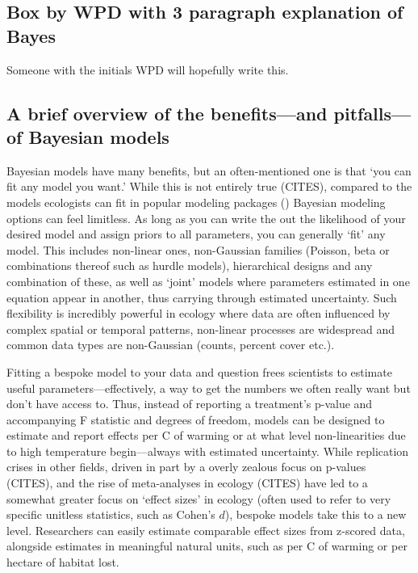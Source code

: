 \documentclass[11pt]{article}
\begin{document}
\subsection{Box by WPD with 3 paragraph explanation of Bayes}

Someone with the initials WPD will hopefully write this. 

\subsection{A brief overview of the benefits---and pitfalls---of Bayesian models} 

Bayesian models have many benefits, but an often-mentioned one is that `you can fit any model you want.' While this is not entirely true (CITES), compared to the models ecologists can fit in popular modeling packages (\eg {}) Bayesian modeling options can feel limitless. As long as you can write the out the likelihood of your desired model and assign priors to all parameters, you can generally `fit' any model. This includes non-linear ones, non-Gaussian families (\eg Poisson, beta or combinations thereof such as hurdle models), hierarchical designs and any combination of these, as well as `joint' models where parameters estimated in one equation appear in another, thus carrying through estimated uncertainty. Such flexibility is incredibly powerful in ecology where data are often influenced by complex spatial or temporal patterns, non-linear processes are widespread and common data types are non-Gaussian (\eg counts, percent cover etc.). 

Fitting a bespoke model to your data and question frees scientists to estimate useful parameters---effectively, a way to get the numbers we often really want but don't have access to. Thus, instead of reporting a treatment's p-value and accompanying F statistic and degrees of freedom, models can be designed to estimate and report effects per \degree C of warming or at what level non-linearities due to high temperature begin---always with estimated uncertainty. While replication crises in other fields, driven in part by a overly zealous focus on p-values (CITES), and the rise of meta-analyses in ecology (CITES) have led to a somewhat greater focus on `effect sizes' in ecology (often used to refer to very specific unitless statistics, such as Cohen's $d$), bespoke models take this to a new level. Researchers can easily estimate comparable effect sizes from z-scored data, alongside estimates in meaningful natural units, such as per \degree C of warming or per hectare of habitat lost. 
\end{document}
